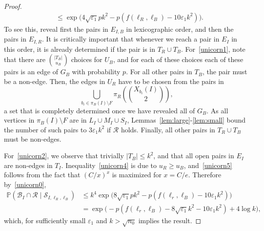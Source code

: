 \documentclass{article}
\newcommand{\p}{\mathbb{P}}
\begin{document}
\begin{proof}
\begin{align}
	&\leq \exp\Big( 4\sqrt{\varepsilon_1} pk^2 - p(f(\ell_R,\ell_B)-10\varepsilon_1 k^2)\Big)\label{unicorn5}.
\end{align}
To see this, reveal first the pairs in $E_{I,B}$ in lexicographic order, and then the pairs in $E_{I,R}$. It is critically important that whenever we reach a pair in $E_{I}$ in this order, it is already determined if the pair is in $T_R\cup T_B$. 
For~\eqref{unicorn1}, note that there are ${|T_B|\choose u_B}$ choices for $U_B$, and for each of these choices each of these pairs is an edge of $G_B$ with probability $p$. For all other pairs in $T_B$, the pair must be a non-edge.
Then, the edges in $U_R$ have to be chosen from the pairs in 
\[
\bigcup_{b_i\in \pi_B(I)\setminus F}\pi_R\left({X_{b_i}(I)\choose 2}\right),
\]
a set that is completely determined once we have revealed all of $G_B$. As all vertices in $\pi_B(I)\setminus F$ are in $L_I\cup M_I\cup S_I$, Lemmas~\ref{lem:large}-\ref{lem:small} bound the number of such pairs to $3\varepsilon_1 k^2$ if $\mathcal R$ holds. Finally, all other pairs in $T_R\cup T_B$ must be non-edges.

For~\eqref{unicorn2}, we observe that trivially $|T_B|\le k^2$, and that all open pairs in $E_I$ are non-edges in $T_I$. Inequality~\eqref{unicorn4} is due to $u_R\ge u_B$, and~\eqref{unicorn5} follows from the fact that $(C/x)^x$ is maximized for $x=C/e$. 
Therefore by~\eqref{unicorn0},
\begin{align*}
\p(\mathcal{B}_I \cap \mathcal R\mid  \mathcal{S}_{I, \ell_R, \ell_B}) 
&\leq 
k^4 \exp\Big( 8\sqrt{\varepsilon_1} pk^2 - p(f(\ell_r,\ell_B)-10\varepsilon_1 k^2)\Big)\\
&=\exp\Big(  - p(f(\ell_r,\ell_B)-8\sqrt{\varepsilon_1} k^2 -10\varepsilon_1 k^2)+4\log k\Big),
\end{align*}
which, for sufficiently small $\varepsilon_1$ and $k>\sqrt{n_0}$ implies the result.
\end{proof}
\end{document}
